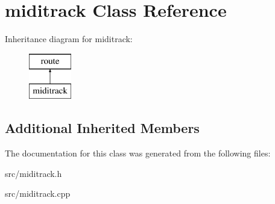 \hypertarget{classmiditrack}{}\section{miditrack Class Reference}
\label{classmiditrack}
Inheritance diagram for miditrack\+:\begin{figure}[H]
\begin{center}
\leavevmode
\includegraphics[height=2.000000cm]{classmiditrack}
\end{center}
\end{figure}
\subsection*{Additional Inherited Members}


The documentation for this class was generated from the following files\+:\begin{DoxyCompactItemize}
\item 
src/miditrack.\+h\item 
src/miditrack.\+cpp\end{DoxyCompactItemize}
